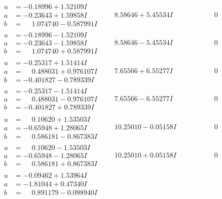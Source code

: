 \documentclass[1p]{elsarticle_modified}
\theoremstyle{definition}
\begin{document}
$$\begin{array}{c|c|c}
\begin{aligned}
u &= -0.18996 + 1.52109 I \\
a &= -0.23643 + 1.59858 I \\
b &= \phantom{-}1.074740 - 0.587991 I\end{aligned}
 & \phantom{-}8.58646 + 5.45534 I & \phantom{-0.000000 } 0 \\ \hline\begin{aligned}
u &= -0.18996 - 1.52109 I \\
a &= -0.23643 - 1.59858 I \\
b &= \phantom{-}1.074740 + 0.587991 I\end{aligned}
 & \phantom{-}8.58646 - 5.45534 I & \phantom{-0.000000 } 0 \\ \hline\begin{aligned}
u &= -0.25317 + 1.51414 I \\
a &= \phantom{-}0.488031 + 0.976107 I \\
b &= -0.401827 - 0.789339 I\end{aligned}
 & \phantom{-}7.65566 + 6.55277 I & \phantom{-0.000000 } 0 \\ \hline\begin{aligned}
u &= -0.25317 - 1.51414 I \\
a &= \phantom{-}0.488031 - 0.976107 I \\
b &= -0.401827 + 0.789339 I\end{aligned}
 & \phantom{-}7.65566 - 6.55277 I & \phantom{-0.000000 } 0 \\ \hline\begin{aligned}
u &= \phantom{-}0.10620 + 1.53503 I \\
a &= -0.65948 + 1.28065 I \\
b &= \phantom{-}0.586181 - 0.867383 I\end{aligned}
 & \phantom{-}10.25010 - 0.05158 I & \phantom{-0.000000 } 0 \\ \hline\begin{aligned}
u &= \phantom{-}0.10620 - 1.53503 I \\
a &= -0.65948 - 1.28065 I \\
b &= \phantom{-}0.586181 + 0.867383 I\end{aligned}
 & \phantom{-}10.25010 + 0.05158 I & \phantom{-0.000000 } 0 \\ \hline\begin{aligned}
u &= -0.09462 + 1.53964 I \\
a &= -1.81044 + 0.47340 I \\
b &= \phantom{-}0.891179 - 0.098940 I\end{aligned}

\end{array}$$
\end{document}
